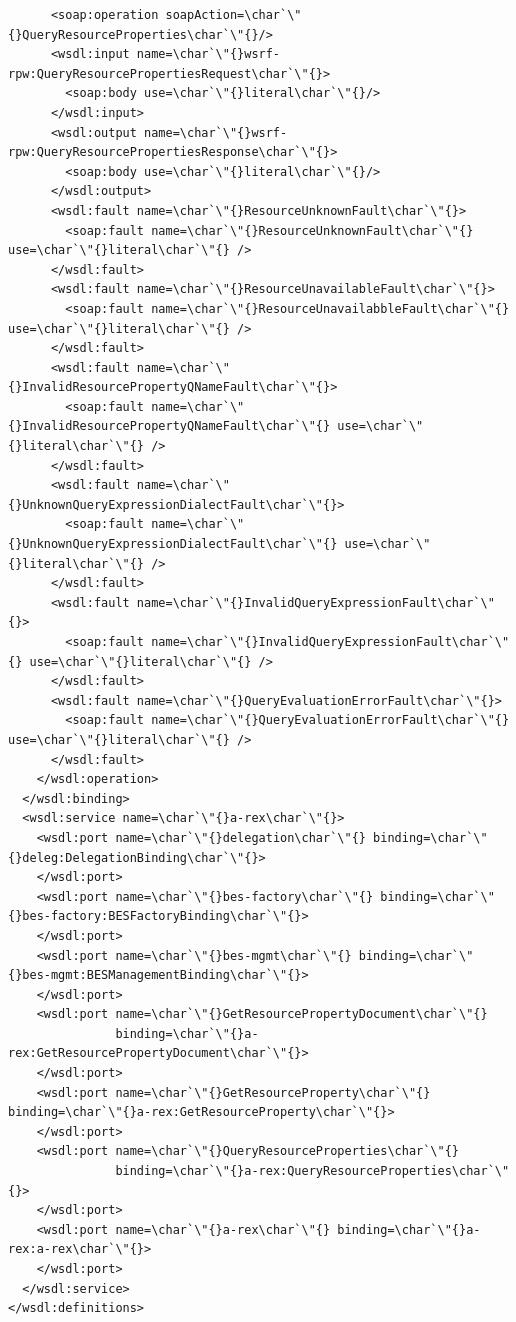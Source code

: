 \documentclass{article}                            %
\begin{document}
\begin{footnotesize}
\begin{verbatim}
      <soap:operation soapAction=\char`\"{}QueryResourceProperties\char`\"{}/>
      <wsdl:input name=\char`\"{}wsrf-rpw:QueryResourcePropertiesRequest\char`\"{}>
        <soap:body use=\char`\"{}literal\char`\"{}/>
      </wsdl:input>
      <wsdl:output name=\char`\"{}wsrf-rpw:QueryResourcePropertiesResponse\char`\"{}>
        <soap:body use=\char`\"{}literal\char`\"{}/>
      </wsdl:output>
      <wsdl:fault name=\char`\"{}ResourceUnknownFault\char`\"{}>
        <soap:fault name=\char`\"{}ResourceUnknownFault\char`\"{} use=\char`\"{}literal\char`\"{} />
      </wsdl:fault>
      <wsdl:fault name=\char`\"{}ResourceUnavailableFault\char`\"{}>
        <soap:fault name=\char`\"{}ResourceUnavailabbleFault\char`\"{} use=\char`\"{}literal\char`\"{} />
      </wsdl:fault>
      <wsdl:fault name=\char`\"{}InvalidResourcePropertyQNameFault\char`\"{}>
        <soap:fault name=\char`\"{}InvalidResourcePropertyQNameFault\char`\"{} use=\char`\"{}literal\char`\"{} />
      </wsdl:fault>
      <wsdl:fault name=\char`\"{}UnknownQueryExpressionDialectFault\char`\"{}>
        <soap:fault name=\char`\"{}UnknownQueryExpressionDialectFault\char`\"{} use=\char`\"{}literal\char`\"{} />
      </wsdl:fault>
      <wsdl:fault name=\char`\"{}InvalidQueryExpressionFault\char`\"{}>
        <soap:fault name=\char`\"{}InvalidQueryExpressionFault\char`\"{} use=\char`\"{}literal\char`\"{} />
      </wsdl:fault>
      <wsdl:fault name=\char`\"{}QueryEvaluationErrorFault\char`\"{}>
        <soap:fault name=\char`\"{}QueryEvaluationErrorFault\char`\"{} use=\char`\"{}literal\char`\"{} />
      </wsdl:fault>
    </wsdl:operation>
  </wsdl:binding>
  <wsdl:service name=\char`\"{}a-rex\char`\"{}>
    <wsdl:port name=\char`\"{}delegation\char`\"{} binding=\char`\"{}deleg:DelegationBinding\char`\"{}>
    </wsdl:port>
    <wsdl:port name=\char`\"{}bes-factory\char`\"{} binding=\char`\"{}bes-factory:BESFactoryBinding\char`\"{}>
    </wsdl:port>
    <wsdl:port name=\char`\"{}bes-mgmt\char`\"{} binding=\char`\"{}bes-mgmt:BESManagementBinding\char`\"{}>
    </wsdl:port>
    <wsdl:port name=\char`\"{}GetResourcePropertyDocument\char`\"{}
               binding=\char`\"{}a-rex:GetResourcePropertyDocument\char`\"{}>
    </wsdl:port>
    <wsdl:port name=\char`\"{}GetResourceProperty\char`\"{} binding=\char`\"{}a-rex:GetResourceProperty\char`\"{}>
    </wsdl:port>
    <wsdl:port name=\char`\"{}QueryResourceProperties\char`\"{}
               binding=\char`\"{}a-rex:QueryResourceProperties\char`\"{}>
    </wsdl:port>
    <wsdl:port name=\char`\"{}a-rex\char`\"{} binding=\char`\"{}a-rex:a-rex\char`\"{}>
    </wsdl:port>
  </wsdl:service>
</wsdl:definitions>
\end{verbatim}
\end{footnotesize}
\end{document}
